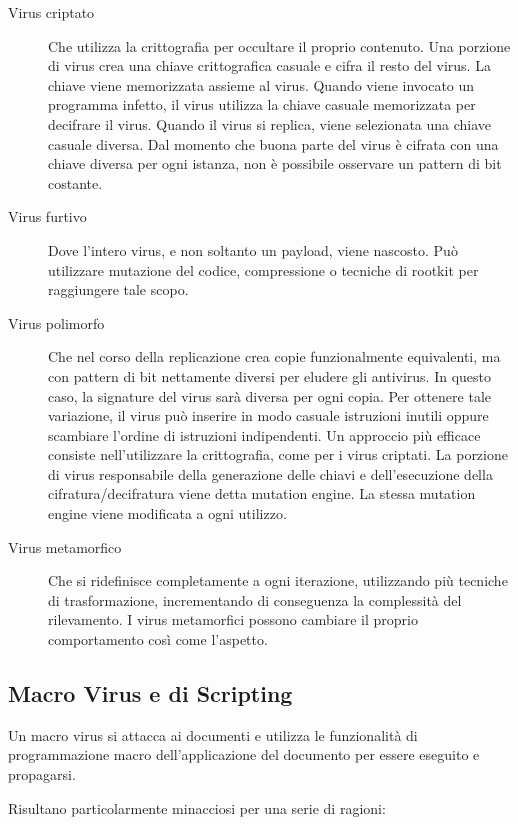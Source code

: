 \begin{description}
    \item[Virus criptato] Che utilizza la crittografia per occultare il proprio contenuto. Una porzione di virus crea una chiave crittografica casuale e cifra il resto del virus. La chiave viene memorizzata assieme al virus. Quando viene invocato un programma infetto, il virus utilizza la chiave casuale memorizzata per decifrare il virus. Quando il virus si replica, viene selezionata una chiave casuale diversa. Dal momento che buona parte del virus è cifrata con una chiave diversa per ogni istanza, non è possibile osservare un pattern di bit costante.
    
    \item[Virus furtivo] Dove l'intero virus, e non soltanto un payload, viene nascosto. Può utilizzare mutazione del codice, compressione o tecniche di rootkit per raggiungere tale scopo.
    
    \item[Virus polimorfo] Che nel corso della replicazione crea copie funzionalmente equivalenti, ma con pattern di bit nettamente diversi per eludere gli antivirus. In questo caso, la signature del virus sarà diversa per ogni copia. Per ottenere tale variazione, il virus può inserire in modo casuale istruzioni inutili oppure scambiare l'ordine di istruzioni indipendenti. Un approccio più efficace consiste nell'utilizzare la crittografia, come per i virus criptati. La porzione di virus responsabile della generazione delle chiavi e dell'esecuzione della cifratura/decifratura viene detta mutation engine. La stessa mutation engine viene modificata a ogni utilizzo.
    
    \item[Virus metamorfico] Che si ridefinisce completamente a ogni iterazione, utilizzando più tecniche di trasformazione, incrementando di conseguenza la complessità del rilevamento. I virus metamorfici possono cambiare il proprio comportamento così come l'aspetto.
\end{description}

\subsection{Macro Virus e di Scripting}

Un macro virus si attacca ai documenti e utilizza le funzionalità di programmazione macro dell'applicazione del documento per essere eseguito e propagarsi.

Risultano particolarmente minacciosi per una serie di ragioni:

